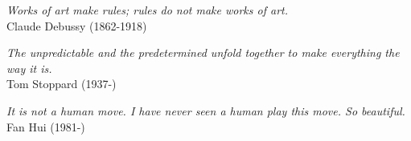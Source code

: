 \documentclass[main.tex]{subfiles}
\begin{document}
\vspace{100mm}
{\raggedleft \textit{Works of art make rules; rules do not make works of art.}  \\ \quad Claude Debussy (1862-1918)\par}

	\vspace{5mm}
{\raggedleft \textit{The unpredictable and the predetermined unfold together to make everything the way it is.} \\ \quad Tom Stoppard (1937-)\par}

	\vspace{5mm}
{\raggedleft \textit{It is not a human move. I have never seen a human play this move. So beautiful.} \\ \quad Fan Hui (1981-)\par}


	
\end{document}
